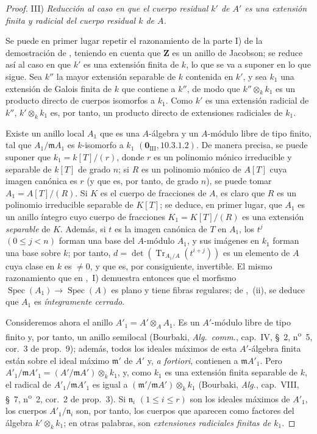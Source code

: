 \begin{proof}
\medskip
\noindent III) \emph{Reducción al caso en que el cuerpo residual $k'$ de $A'$ es una extensión finita y radicial del
cuerpo residual $k$ de $A$.}

\medskip
Se puede en primer lugar repetir el razonamiento de la parte I) de la
demostración de , teniendo en cuenta que $\mathbf Z$ es un
anillo de Jacobson; se reduce así al caso en que $k'$ es una extensión finita de $k$, lo que se va a suponer en lo que sigue.
Sea $k''$ la mayor extensión separable de $k$ contenida en $k'$, y sea $k_1$ una extensión de Galois finita de $k$ que contiene a $k''$, de modo que $k''\otimes_k k_1$ es un producto directo de cuerpos isomorfos a $k_1$.
Como $k'$ es una extensión radicial de $k''$, $k'\otimes_k k_1$ es, por tanto, un producto directo de extensiones radiciales de $k_1$.

Existe un anillo local $A_1$ que es una $A$-álgebra y un $A$-módulo libre de tipo finito, tal que $A_1/\mathfrak m A_1$ es $k$-isomorfo a $k_1$ $(\mathbf 0_{\mathrm{III}},10.3.1.2)$.
De manera precisa, se puede suponer
que $k_1=k[T]/(r)$, donde $r$ es un polinomio mónico irreducible y separable de
$k[T]$ de grado $n$; si $R$ es un polinomio mónico de $A[T]$ cuya imagen
canónica es $r$ (y que es, por tanto, de grado $n$), se puede tomar
$A_1=A[T]/(R)$.
Si $K$ es el cuerpo de fracciones de $A$, es claro que $R$ es un polinomio irreducible separable de $K[T]$; se deduce, en primer lugar, que $A_1$ es un anillo íntegro cuyo cuerpo de fracciones $K_1=K[T]/(R)$ es una extensión \emph{separable} de $K$.
Además, si $t$ es la imagen canónica de $T$ en $A_1$, los $t^j$ $(0\leq j<n)$ forman una base del $A$-módulo $A_1$, y sus imágenes en $k_1$ forman una base sobre $k$; por tanto, $d=\det(\operatorname{Tr}_{A_1/A}(t^{i+j}))$ es un elemento de $A$ cuya clase en $k$ es $\ne0$, y que es, por consiguiente, invertible.
El mismo razonamiento que en ,~I) demuestra entonces que el morfismo $\operatorname{Spec}(A_1)\to\operatorname{Spec}(A)$ es plano y tiene fibras regulares; de ,~(ii), se deduce que $A_1$ es \emph{íntegramente cerrado}.

Consideremos ahora el anillo $A'_1=A'\otimes_A A_1$.
Es un $A'$-módulo libre de tipo finito y, por tanto, un anillo semilocal (Bourbaki, \emph{Alg.\ comm.}, cap.~IV, \S~2, n\textsuperscript{o}~5, cor.~3 de prop.~9); además, todos los ideales máximos de esta $A'$-álgebra finita están sobre el ideal máximo $\mathfrak m'$ de $A'$ y, \emph{a fortiori}, contienen a $\mathfrak m A'_1$.
Pero
$A'_1/\mathfrak m A'_1=(A'/\mathfrak m A')\otimes_k k_1$,
y, como $k_1$ es una extensión finita separable de $k$, el radical de $A'_1/\mathfrak m A'_1$ es igual a $(\mathfrak m'/\mathfrak m A')\otimes_k k_1$ (Bourbaki, \emph{Alg.}, cap.~VIII, \S~7, n\textsuperscript{o}~2, cor.~2 de prop.~3).
Si $\mathfrak n_i$ $(1\leq i\leq r)$ son los ideales máximos de $A'_1$, los cuerpos $A'_1/\mathfrak n_i$ son, por tanto, los cuerpos que aparecen como factores del álgebra $k'\otimes_k k_1$; en otras palabras, son \emph{extensiones radiciales finitas de $k_1$}.


\end{proof}
